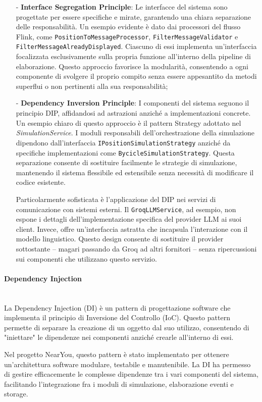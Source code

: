 \documentclass[10pt]{article}
\newcommand{\myparagraph}[1]{\paragraph{#1}\mbox{}\\}
\begin{document}
\begin{itemize}
        \item[-] \textbf{Interface Segregation Principle}: Le interfacce del sistema sono progettate per essere specifiche e mirate, garantendo una chiara separazione delle responsabilità. Un esempio evidente è dato dai processori del flusso Flink, come \texttt{PositionToMessageProcessor}, \texttt{FilterMessageValidator} e \texttt{FilterMessageAlreadyDisplayed}. Ciascuno di essi implementa un'interfaccia focalizzata esclusivamente sulla propria funzione all'interno della pipeline di elaborazione. Questo approccio favorisce la modularità, consentendo a ogni componente di svolgere il proprio compito senza essere appesantito da metodi superflui o non pertinenti alla sua responsabilità;

        \item[-] \textbf{Dependency Inversion Principle}: I componenti del sistema seguono il principio DIP, affidandosi ad astrazioni anziché a implementazioni concrete. Un esempio chiaro di questo approccio è il pattern Strategy adottato nel \textit{SimulationService}. I moduli responsabili dell'orchestrazione della simulazione dipendono dall'interfaccia \texttt{IPositionSimulationStrategy} anziché da specifiche implementazioni come \texttt{BycicleSimulationStrategy}. Questa separazione consente di sostituire facilmente le strategie di simulazione, mantenendo il sistema flessibile ed estensibile senza necessità di modificare il codice esistente.

        Particolarmente sofisticata è l'applicazione del DIP nei servizi di comunicazione con sistemi esterni. Il \texttt{GroqLLMService}, ad esempio, non espone i dettagli dell'implementazione specifica del provider LLM ai suoi client. Invece, offre un'interfaccia astratta che incapsula l'interazione con il modello linguistico. Questo design consente di sostituire il provider sottostante – magari passando da Groq ad altri fornitori – senza ripercussioni sui componenti che utilizzano questo servizio.
    \end{itemize}

    \myparagraph{Dependency Injection}

    La Dependency Injection (DI) è un pattern di progettazione software che implementa il principio di Inversione del Controllo (IoC). Questo pattern permette di separare la creazione di un oggetto dal suo utilizzo, consentendo di "iniettare" le dipendenze nei componenti anziché crearle all'interno di essi.
    
    Nel progetto NearYou, questo pattern è stato implementato per ottenere un'architettura software modulare, testabile e manutenibile. La DI ha permesso di gestire efficacemente le complesse dipendenze tra i vari componenti del sistema, facilitando l'integrazione fra i moduli di simulazione, elaborazione eventi e storage.
    
\end{document}
